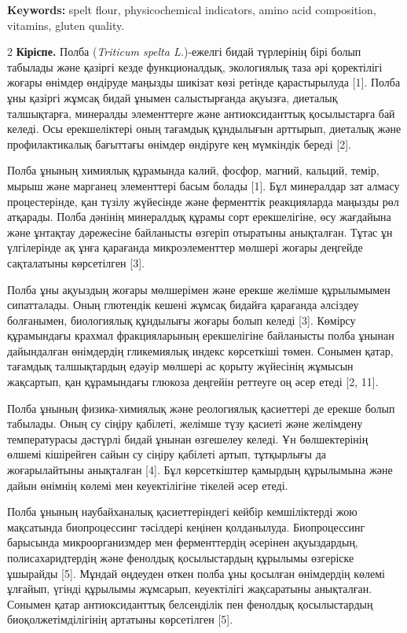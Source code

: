 {\bfseries Keywords:} spelt flour, physicochemical indicators, amino acid
composition, vitamins, gluten quality.

\begin{multicols}{2}
{\bfseries Кіріспе.} Полба (\emph{Triticum spelta L.})-ежелгі бидай
түрлерінің бірі болып табылады және қазіргі кезде функционалдық,
экологиялық таза әрі қоректілігі жоғары өнімдер өндіруде маңызды шикізат
көзі ретінде қарастырылуда {[}1{]}. Полба ұны қазіргі жұмсақ бидай
ұнымен салыстырғанда ақуызға, диеталық талшықтарға, минералды
элементтерге және антиоксиданттық қосылыстарға бай келеді. Осы
ерекшеліктері оның тағамдық құндылығын арттырып, диеталық және
профилактикалық бағыттағы өнімдер өндіруге кең мүмкіндік береді {[}2{]}.

Полба ұнының химиялық құрамында калий, фосфор, магний, кальций, темір,
мырыш және марганец элементтері басым болады {[}1{]}. Бұл минералдар зат
алмасу процестерінде, қан түзілу жүйесінде және ферменттік реакцияларда
маңызды рөл атқарады. Полба дәнінің минералдық құрамы сорт ерекшелігіне,
өсу жағдайына және ұнтақтау дәрежесіне байланысты өзгеріп отыратыны
анықталған. Тұтас ұн үлгілерінде ақ ұнға қарағанда микроэлементтер
мөлшері жоғары деңгейде сақталатыны көрсетілген {[}3{]}.

Полба ұны ақуыздың жоғары мөлшерімен және ерекше желімше құрылымымен
сипатталады. Оның глютендік кешені жұмсақ бидайға қарағанда әлсіздеу
болғанымен, биологиялық құндылығы жоғары болып келеді {[}3{]}. Көмірсу
құрамындағы крахмал фракцияларының ерекшелігіне байланысты полба ұнынан
дайындалған өнімдердің гликемиялық индекс көрсеткіші төмен. Сонымен
қатар, тағамдық талшықтардың едәуір мөлшері ас қорыту жүйесінің жұмысын
жақсартып, қан құрамындағы глюкоза деңгейін реттеуге оң әсер етеді {[}2,
11{]}.

Полба ұнының физика-химиялық және реологиялық қасиеттері де ерекше болып
табылады. Оның су сіңіру қабілеті, желімше түзу қасиеті және желімдену
температурасы дәстүрлі бидай ұнынан өзгешелеу келеді. Ұн бөлшектерінің
өлшемі кішірейген сайын су сіңіру қабілеті артып, тұтқырлығы да
жоғарылайтыны анықталған {[}4{]}. Бұл көрсеткіштер қамырдың құрылымына
және дайын өнімнің көлемі мен кеуектілігіне тікелей әсер етеді.

Полба ұнының наубайханалық қасиеттеріндегі кейбір кемшіліктерді жою
мақсатында биопроцессинг тәсілдері кеңінен қолданылуда. Биопроцессинг
барысында микроорганизмдер мен ферменттердің әсерінен ақуыздардың,
полисахаридтердің және фенолдық қосылыстардың құрылымы өзгеріске
ұшырайды {[}5{]}. Мұндай өңдеуден өткен полба ұны қосылған өнімдердің
көлемі ұлғайып, үгінді құрылымы жұмсарып, кеуектілігі жақсаратыны
анықталған. Сонымен қатар антиоксиданттық белсенділік пен фенолдық
қосылыстардың биоқолжетімділігінің артатыны көрсетілген {[}5{]}.


\end{multicols}
